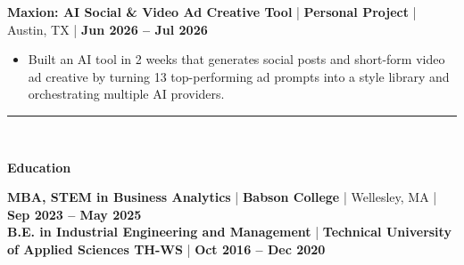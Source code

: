 \documentclass[11pt,letterpaper]{article}
\newcommand{\sectiontitle}[1]{%
  \vspace{3pt}
  \rule{\linewidth}{1.0pt}\\[-12pt]
  \begin{center}
    {\large \textbf{#1}}\\[-5pt]
  \end{center}
  \vspace{-3pt}
}
\newcommand{\job}[4]{%
  \textbf{#1} \;|\; \textbf{#2} \;|\; #3 \;|\; \textbf{#4}\par%
  \vspace{1pt}%
}
\begin{document}
\job{Maxion: AI Social \& Video Ad Creative Tool}
{Personal Project}
{Austin, TX}
{Jun 2026 -- Jul 2026}
\begin{itemize}
  \item Built an AI tool in 2 weeks that generates social posts and short-form video ad creative by turning 13 top-performing ad prompts into a style library and orchestrating multiple AI providers.
\end{itemize}

\sectiontitle{Education}
\textbf{MBA, STEM in Business Analytics} \;|\; \textbf{Babson College} \;|\; Wellesley, MA \;|\; \textbf{Sep 2023 -- May 2025}\\
\textbf{B.E. in Industrial Engineering and Management} \;|\; \textbf{Technical University of Applied Sciences TH-WS} \;|\; \textbf{Oct 2016 -- Dec 2020}
\end{document}
